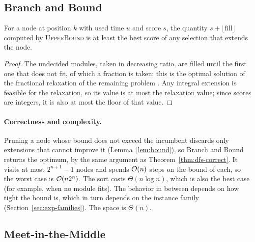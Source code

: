\subsection{Branch and Bound}

\begin{lemma}\label{lem:bound}
For a node at position $k$ with used time $u$ and score $s$, the quantity $s+\lfloor\mathrm{fill}\rfloor$ computed by \textsc{UpperBound} is at least the best score of any selection that extends the node.
\end{lemma}
\begin{proof}
The undecided modules, taken in decreasing ratio, are filled until the first one that does not fit, of which a fraction is taken: this is the optimal solution of the fractional relaxation of the remaining problem \cite{dantzig1957}. Any integral extension is feasible for the relaxation, so its value is at most the relaxation value; since scores are integers, it is also at most the floor of that value.
\end{proof}

\paragraph{Correctness and complexity.} Pruning a node whose bound does not exceed the incumbent discards only extensions that cannot improve it (Lemma~\ref{lem:bound}), so Branch and Bound returns the optimum, by the same argument as Theorem~\ref{thm:dfs-correct}. It visits at most $2^{n+1}-1$ nodes and spends $\mathcal{O}(n)$ steps on the bound of each, so the worst case is $\mathcal{O}(n2^n)$. The sort costs $\Theta(n\log n)$, which is also the best case (for example, when no module fits). The behavior in between depends on how tight the bound is, which in turn depends on the instance family (Section~\ref{sec:exp-families}). The space is $\Theta(n)$.

\subsection{Meet-in-the-Middle}

